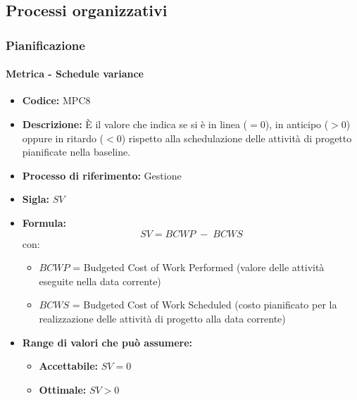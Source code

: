 \subsection{Processi organizzativi}

\subsubsection{Pianificazione}
    \paragraph{Metrica - Schedule variance}
    \begin{itemize}
        \item \textbf{Codice:} MPC8
        \item \textbf{Descrizione:} È il valore che indica se si è in linea ($=0$), in anticipo ($>0$) oppure in ritardo ($<0$) rispetto alla schedulazione delle attività di progetto pianificate nella baseline.
        \item \textbf{Processo di riferimento:} Gestione
        \item \textbf{Sigla:} $SV$
        \item \textbf{Formula:} $$SV = {BCWP \; - \; BCWS}$$
        con:
        \begin{itemize}
            \item $BCWP$ = Budgeted Cost of Work Performed (valore delle attività eseguite nella data corrente)
            \item $BCWS$ = Budgeted Cost of Work Scheduled (costo pianificato per la realizzazione delle attività di progetto alla data corrente)
        \end{itemize}
        \item \textbf{Range di valori che può assumere:}
        \begin{itemize}
            \item \textbf{Accettabile:} $SV = 0$
            \item \textbf{Ottimale:} $SV > 0$
        \end{itemize}
    \end{itemize}

